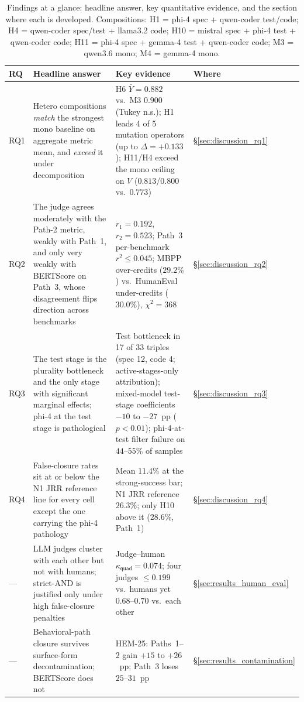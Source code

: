 \begin{table}[!htbp]
\centering
\small
\caption{Findings at a glance: headline answer, key quantitative evidence, and the section where each is developed. Compositions: H1 = phi-4 spec + qwen-coder test/code; H4 = qwen-coder spec/test + llama3.2 code; H10 = mistral spec + phi-4 test + qwen-coder code; H11 = phi-4 spec + gemma-4 test + qwen-coder code; M3 = qwen3.6 mono; M4 = gemma-4 mono.}
\label{tab:findings_glance}
\begin{tabular}{@{}p{0.55cm}p{4.9cm}p{4.9cm}p{1.1cm}@{}}
\toprule
RQ & Headline answer & Key evidence & Where \\
\midrule
RQ1 & Hetero compositions \emph{match} the strongest mono baseline on aggregate metric mean, and \emph{exceed} it under decomposition & H6 $\bar{Y} = 0.882$ vs.\ M3 $0.900$ (Tukey n.s.); H1 leads 4 of 5 mutation operators (up to $\Delta = +0.133$); H11/H4 exceed the mono ceiling on $V$ ($0.813$/$0.800$ vs.\ $0.773$) & \S\ref{sec:discussion_rq1} \\
\addlinespace
RQ2 & The judge agrees moderately with the Path-2 metric, weakly with Path~1, and only very weakly with BERTScore on Path~3, whose disagreement flips direction across benchmarks & $r_1 = 0.192$, $r_2 = 0.523$; Path~3 per-benchmark $r^2 \leq 0.045$; MBPP over-credits ($29.2\%$) vs.\ HumanEval under-credits ($30.0\%$), $\chi^2 = 368$ & \S\ref{sec:discussion_rq2} \\
\addlinespace
RQ3 & The test stage is the plurality bottleneck and the only stage with significant marginal effects; phi-4 at the test stage is pathological & Test bottleneck in 17 of 33 triples (spec 12, code 4; active-stages-only attribution); mixed-model test-stage coefficients $-10$ to $-27$~pp ($p < 0.01$); phi-4-at-test filter failure on $44$--$55\%$ of samples & \S\ref{sec:discussion_rq3} \\
\addlinespace
RQ4 & False-closure rates sit at or below the N1 JRR reference line for every cell except the one carrying the phi-4 pathology & Mean $11.4\%$ at the strong-success bar; N1 JRR reference $26.3\%$; only H10 above it ($28.6\%$, Path~1) & \S\ref{sec:discussion_rq4} \\
\midrule
--- & LLM judges cluster with each other but not with humans; strict-AND is justified only under high false-closure penalties & Judge--human $\kappa_{\textsf{quad}} = 0.074$; four judges $\leq 0.199$ vs.\ humans yet $0.68$--$0.70$ vs.\ each other & \S\ref{sec:results_human_eval} \\
\addlinespace
--- & Behavioral-path closure survives surface-form decontamination; BERTScore does not & HEM-25: Paths~1--2 gain $+15$ to $+26$~pp; Path~3 loses $25$--$31$~pp & \S\ref{sec:results_contamination} \\
\bottomrule
\end{tabular}
\end{table}

